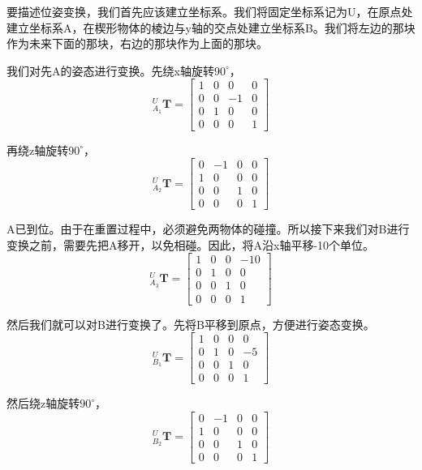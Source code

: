 \documentclass{homework}
\begin{document}
\begin{sol}

  要描述位姿变换，我们首先应该建立坐标系。我们将固定坐标系记为{U}，在原点处建立坐标系{A}，在楔形物体的棱边与y轴的交点处建立坐标系{B}。我们将左边的那块作为未来下面的那块，右边的那块作为上面的那块。


  我们对先A的姿态进行变换。先绕x轴旋转$ 90^\circ $，
  \[
    _{A_1}^U\mathbf{T} = 
    \begin{bmatrix}
      1 & 0 & 0 & 0 \\
      0 & 0 & -1 & 0 \\
      0 & 1 & 0 & 0 \\
      0 & 0 & 0 & 1
    \end{bmatrix}
  \]

  再绕z轴旋转$ 90^\circ $，
  \[
    _{A_2}^U\mathbf{T} = 
    \begin{bmatrix}
      0 & -1 & 0 & 0 \\
      1 & 0 & 0 & 0 \\
      0 & 0 & 1 & 0 \\
      0 & 0 & 0 & 1
    \end{bmatrix}
  \]

  A已到位。由于在重置过程中，必须避免两物体的碰撞。所以接下来我们对B进行变换之前，需要先把A移开，以免相碰。因此，将A沿x轴平移-10个单位。
  \[
    _{A_3}^U\mathbf{T} = 
    \begin{bmatrix}
      1 & 0 & 0 & -10 \\
      0 & 1 & 0 & 0 \\
      0 & 0 & 1 & 0 \\
      0 & 0 & 0 & 1
    \end{bmatrix}
  \]

  然后我们就可以对B进行变换了。先将B平移到原点，方便进行姿态变换。
  \[
    _{B_1}^U\mathbf{T} = 
    \begin{bmatrix}
      1 & 0 & 0 & 0 \\
      0 & 1 & 0 & -5 \\
      0 & 0 & 1 & 0 \\
      0 & 0 & 0 & 1
    \end{bmatrix}
  \]

  然后绕z轴旋转$ 90^\circ $，
  \[
    _{B_2}^U\mathbf{T} = 
    \begin{bmatrix}
      0 & -1 & 0 & 0 \\
      1 & 0 & 0 & 0 \\
      0 & 0 & 1 & 0 \\
      0 & 0 & 0 & 1
    \end{bmatrix}
  \]


\end{sol}
\end{document}
